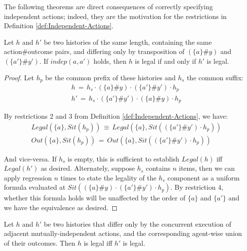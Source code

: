 The following theorems are direct consequences of correctly specifying
independent actions; indeed, they are the motivation for the restrictions
in Definition \ref{def:Independent-Actions}.

\begin{thm}
Let $h$ and $h'$ be two histories of the same length, containing
the same action\#outcome pairs, and differing only by transposition
of $(\{a\}\#y)$ and $(\{a'\}\#y')$. If $indep(a,a')$ holds, then
$h$ is legal if and only if $h'$ is legal.\label{thm:Indep-Trans-Equiv} 
\end{thm}
\begin{proof}
Let $h_{p}$ be the common prefix of these histories and $h_{s}$
the common suffix:\begin{gather*}
h\,=\, h_{s}\cdot(\{a\}\#y)\cdot(\{a'\}\#y')\cdot h_{p}\\
h'\,=\, h_{s}\cdot(\{a'\}\#y')\cdot(\{a\}\#y)\cdot h_{p}\end{gather*}


By restrictions 2 and 3 from Definition \ref{def:Independent-Actions},
we have:\begin{gather*}
Legal(\{a\},Sit(h_{p}))\,\equiv\, Legal(\{a\},Sit((\{a'\}\#y')\cdot h_{p}))\\
Out(\{a\},Sit(h_{p}))\,=\, Out(\{a\},Sit((\{a'\}\#y')\cdot h_{p}))\end{gather*}


And vice-versa. If $h_{s}$ is empty, this is sufficient to establish
$Legal(h)$ iff $Legal(h')$ as desired. Alternately, suppose $h_{s}$
contains $n$ items, then we can apply regression $n$ times to state
the legality of the $h_{s}$ component as a uniform formula evaluated
at $Sit((\{a\}\#y)\cdot(\{a'\}\#y')\cdot h_{p})$. By restriction
4, whether this formula holds will be unaffected by the order of $\{a\}$
and $\{a'\}$ and we have the equivalence as desired. 
\end{proof}
\begin{thm}
Let $h$ and $h'$ be two histories that differ only by the concurrent
execution of adjacent mutually-independent actions, and the corresponding
agent-wise union of their outcomes. Then $h$ is legal iff $h'$ is
legal.\label{thm:Indep-Conc-Equiv} 
\end{thm}

